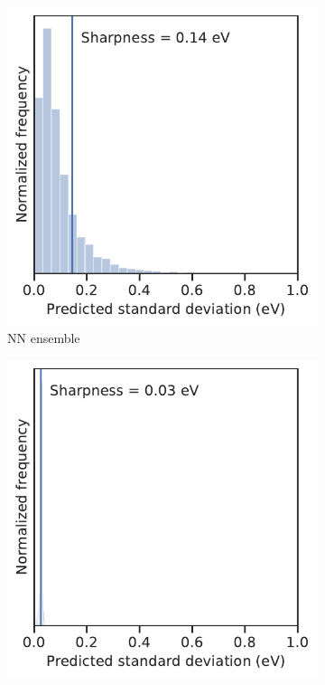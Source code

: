 \documentclass[]{achemso}
\begin{document}
\begin{figure}
    \centering
    \begin{subfigure}{0.32\textwidth}
        \includegraphics[width=\textwidth]{../NN_ensemble/sharpness.pdf}
        \caption{\gls{NN} ensemble}\label{fig:sharpness_ensemble}
    \end{subfigure}
    \begin{subfigure}{0.32\textwidth}
        \includegraphics[width=\textwidth]{../BNN/sharpness.pdf}

\end{subfigure}
\end{figure}
\end{document}
